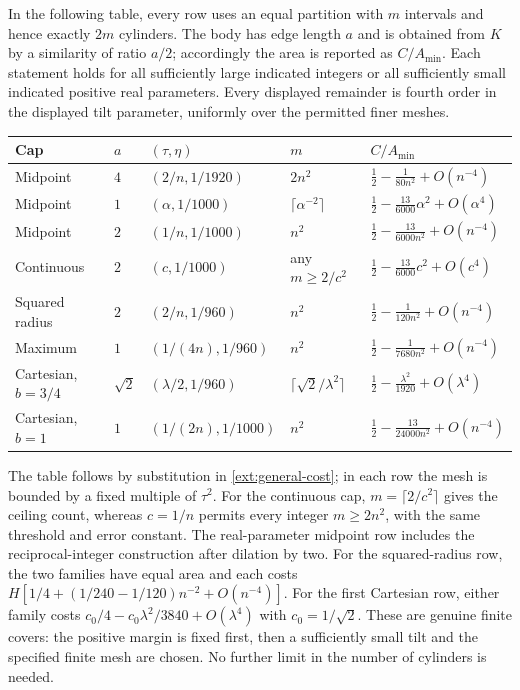 In the following table, every row uses an equal partition with $m$ intervals
and hence exactly $2m$ cylinders.  The body has edge length $a$ and is
obtained from $K$ by a similarity of ratio $a/2$; accordingly the area
is reported as $C/A_{\min}$.  Each statement holds for all sufficiently
large indicated integers or all sufficiently small indicated positive
real parameters.  Every displayed remainder is fourth order in the
displayed tilt parameter, uniformly over the permitted finer meshes.
\begin{center}
\small
\renewcommand{\arraystretch}{1.3}
\begin{tabular}{lllll}
\toprule
Cap & $a$ & $(\tau,\eta)$ & $m$ & $C/A_{\min}$\\
\midrule
Midpoint & $4$ & $(2/n,1/1920)$ & $2n^2$
 & $\frac12-\frac1{80n^2}+O(n^{-4})$\\
Midpoint & $1$ & $(\alpha,1/1000)$ & $\lceil\alpha^{-2}\rceil$
 & $\frac12-\frac{13}{6000}\alpha^2+O(\alpha^4)$\\
Midpoint & $2$ & $(1/n,1/1000)$ & $n^2$
 & $\frac12-\frac{13}{6000n^2}+O(n^{-4})$\\
Continuous & $2$ & $(c,1/1000)$ & any $m\ge2/c^2$
 & $\frac12-\frac{13}{6000}c^2+O(c^4)$\\
Squared radius & $2$ & $(2/n,1/960)$ & $n^2$
 & $\frac12-\frac1{120n^2}+O(n^{-4})$\\
Maximum & $1$ & $(1/(4n),1/960)$ & $n^2$
 & $\frac12-\frac1{7680n^2}+O(n^{-4})$\\
Cartesian, $b=3/4$ & $\sqrt2$ & $(\lambda/2,1/960)$
 & $\lceil\sqrt2/\lambda^2\rceil$
 & $\frac12-\frac{\lambda^2}{1920}+O(\lambda^4)$\\
Cartesian, $b=1$ & $1$ & $(1/(2n),1/1000)$ & $n^2$
 & $\frac12-\frac{13}{24000n^2}+O(n^{-4})$\\
\bottomrule
\end{tabular}
\end{center}
The table follows by substitution in \eqref{ext:general-cost}; in each
row the mesh is bounded by a fixed multiple of $\tau^2$.
For the continuous cap, $m=\lceil2/c^2\rceil$ gives the ceiling count,
whereas $c=1/n$ permits every integer $m\ge2n^2$, with the same
threshold and error constant.  The real-parameter midpoint row includes
the reciprocal-integer construction after dilation by two.
For the squared-radius row, the two families have equal area and each
costs $H[1/4+(1/240-1/120)n^{-2}+O(n^{-4})]$.
For the first Cartesian row, either family costs
$c_0/4-c_0\lambda^2/3840+O(\lambda^4)$ with $c_0=1/\sqrt2$.
These are genuine finite covers: the positive margin is fixed first,
then a sufficiently small tilt and the specified finite mesh are chosen.
No further limit in the number of cylinders is needed.


